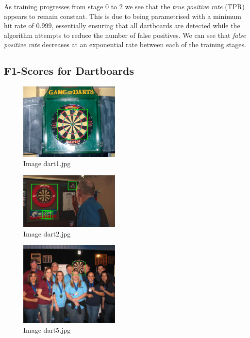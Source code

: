 \documentclass[conference]{IEEEtran}
\begin{document}
As training progresses from stage 0 to 2 we see that the \textit{true positive rate} (TPR) appears to remain constant. This is due to being parametrised with a minimum hit rate of 0.999, essentially ensuring that all dartboards are detected while the algorithm attempts to reduce the number of false positives. We can see that \textit{false positive rate} decreases at an exponential rate between each of the training stages.

\subsection{F1-Scores for Dartboards}

\begin{figure}[ht!]
	\centering
	\includegraphics[width=50mm]{img/Viola_Jones_Darts/detected_dart1.jpg}
	\caption{Image dart1.jpg \label{img_dart_1}}
\end{figure}

\begin{figure}[ht!]
	\centering
	\includegraphics[width=50mm]{img/Viola_Jones_Darts/detected_dart2.jpg}
	\caption{Image dart2.jpg \label{img_dart_2}}
\end{figure}

\begin{figure}[ht!]
	\centering
	\includegraphics[width=50mm]{img/Viola_Jones_Darts/detected_dart5.jpg}
	\caption{Image dart5.jpg \label{img_dart_5}}
\end{figure}
\end{document}

